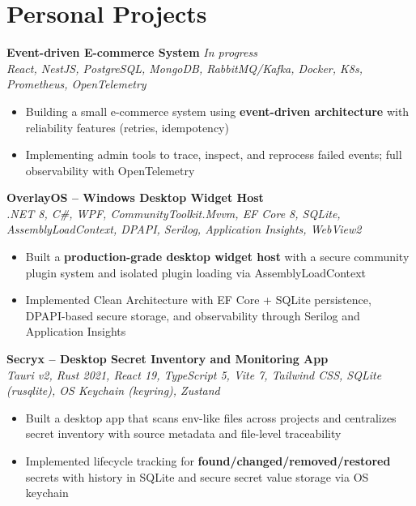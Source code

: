 \documentclass[10pt,a4paper]{article}
\begin{document}
\section*{Personal Projects}
{\small

\textbf{Event-driven E-commerce System} \hfill \textit{In progress}\\[1pt]
\textit{React, NestJS, PostgreSQL, MongoDB, RabbitMQ/Kafka, Docker, K8s, Prometheus, OpenTelemetry}
\begin{itemize}
  \item Building a small e-commerce system using \textbf{event-driven architecture} with reliability features (retries, idempotency)
  \item Implementing admin tools to trace, inspect, and reprocess failed events; full observability with OpenTelemetry
\end{itemize}

\vspace{3pt}
\textbf{OverlayOS -- Windows Desktop Widget Host} \\[1pt]
\textit{.NET 8, C\#, WPF, CommunityToolkit.Mvvm, EF Core 8, SQLite, AssemblyLoadContext, DPAPI, Serilog, Application Insights, WebView2}
\begin{itemize}
  \item Built a \textbf{production-grade desktop widget host} with a secure community plugin system and isolated plugin loading via AssemblyLoadContext
  \item Implemented Clean Architecture with EF Core + SQLite persistence, DPAPI-based secure storage, and observability through Serilog and Application Insights
\end{itemize}

\vspace{3pt}
\textbf{Secryx -- Desktop Secret Inventory and Monitoring App} \\[1pt]
\textit{Tauri v2, Rust 2021, React 19, TypeScript 5, Vite 7, Tailwind CSS, SQLite (rusqlite), OS Keychain (keyring), Zustand}
\begin{itemize}
  \item Built a desktop app that scans env-like files across projects and centralizes secret inventory with source metadata and file-level traceability
  \item Implemented lifecycle tracking for \textbf{found/changed/removed/restored} secrets with history in SQLite and secure secret value storage via OS keychain
\end{itemize}

}
\end{document}
